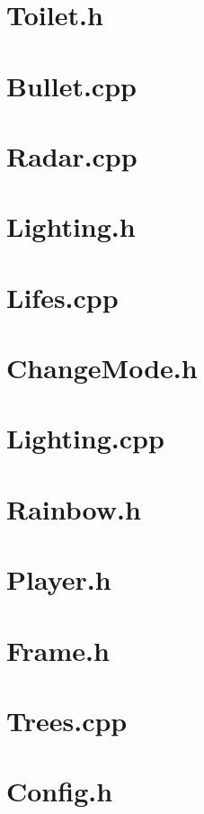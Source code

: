 \section*{Toilet.h}

\pagebreak
\section*{Bullet.cpp}

\pagebreak
\section*{Radar.cpp}

\pagebreak
\section*{Lighting.h}

\pagebreak
\section*{Lifes.cpp}

\pagebreak
\section*{ChangeMode.h}

\pagebreak
\section*{Lighting.cpp}

\pagebreak
\section*{Rainbow.h}

\pagebreak
\section*{Player.h}

\pagebreak
\section*{Frame.h}

\pagebreak
\section*{Trees.cpp}

\pagebreak
\section*{Config.h}

\pagebreak
